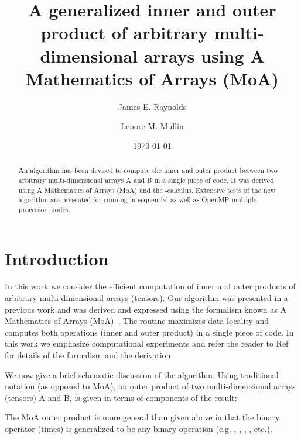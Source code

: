 \documentclass[aps,prl,twocolumn,groupedaddress,floatfix]{revtex4}
\begin{document}
\title{A generalized inner and outer product of arbitrary multi-dimensional 
arrays using A Mathematics of Arrays (MoA)}



\author{James E. Raynolds} 
\address{College of Nanoscale Science and Engineering, University
at Albany, State University of New York, Albany, NY}
\author{Lenore M. Mullin}
\address{National Science Foundation, Arlington, VA}
\affiliation{}



\date{\today}

\begin{abstract}
An algorithm has been devised to compute the inner and outer product 
between two arbitrary multi-dimensional arrays A and B in a single 
piece of code.  It was derived using A Mathematics of Arrays (MoA) and the 
-calculus.  Extensive tests of the new algorithm are presented for
running in sequential as well as OpenMP multiple processor modes.

\end{abstract}

\pacs{}


\maketitle







\section{Introduction}

In this work we consider the efficient computation of inner and outer
products of arbitrary multi-dimensional arrays (tensors).  Our algorithm was 
presented in a previous work and was derived and expressed using the 
formalism known as A Mathematics of Arrays (MoA)~\cite{mul88}.  The routine 
maximizes data locality and computes both operations (inner and outer 
product) in a single piece of code.  In this work we emphasize computational
experiments and refer the reader to Ref~\citep{mul88} for details of the
formalism and the derivation.  

We now give a brief schematic discussion of the algorithm.  Using traditional
notation (as opposed to MoA), an outer product of two multi-dimensional
arrays (tensors) A and B, is given in terms of components of the result:

The MoA outer product is more general than given above in that the binary
operator  (times) is generalized to be any binary operation (e.g. ,
, , , etc.).
\end{document}
